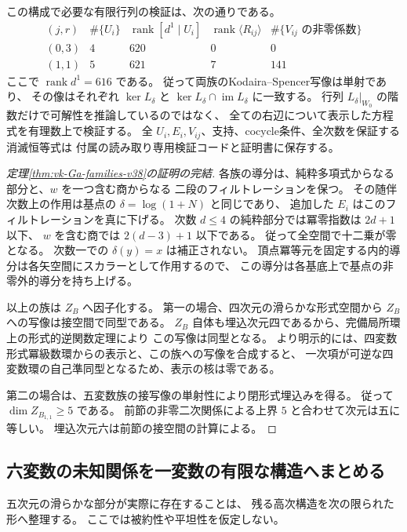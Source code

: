 この構成で必要な有限行列の検証は、次の通りである。
\[
\begin{array}{c|c|c|c|c}
 (j,r)&\#\{U_i\}&\operatorname{rank}[d^1\mid U_i]&
 \operatorname{rank}\langle R_{ij}\rangle&\#\{V_{ij}\text{ の非零係数}\}\\\hline
 (0,3)&4&620&0&0\\
 (1,1)&5&621&7&141
\end{array}
\]
ここで $\operatorname{rank}d^1=616$ である。
従って両族のKodaira--Spencer写像は単射であり、
その像はそれぞれ $\ker L_\delta$ と
$\ker L_\delta\cap\operatorname{im}L_\delta$ に一致する。
行列 $L_\delta|_{W_0}$ の階数だけで可解性を推論しているのではなく、
全ての右辺について表示した方程式を有理数上で検証する。
全 $U_i,E_i,V_{ij}$、支持、cocycle条件、全次数を保証する消滅恒等式は
付属の読み取り専用検証コードと証明書に保存する。

\begin{proof}[定理\ref{thm:vk-Ga-families-v38}の証明の完結]
各族の導分は、純粋多項式からなる部分と、$w$ を一つ含む商からなる
二段のフィルトレーションを保つ。
その随伴次数上の作用は基点の $\delta=\log(1+N)$ と同じであり、
追加した $E_i$ はこのフィルトレーションを真に下げる。
次数 $d\le4$ の純粋部分では冪零指数は $2d+1$ 以下、
$w$ を含む商では $2(d-3)+1$ 以下である。
従って全空間で十二乗が零となる。
次数一での $\delta(y)=x$ は補正されない。
頂点冪等元を固定する内的導分は各矢空間にスカラーとして作用するので、
この導分は各基底上で基点の非零外的導分を持ち上げる。

以上の族は $Z_B$ へ因子化する。
第一の場合、四次元の滑らかな形式空間から $Z_B$ への写像は接空間で同型である。
$Z_B$ 自体も埋込次元四であるから、完備局所環上の形式的逆関数定理により
この写像は同型となる。
より明示的には、四変数形式冪級数環からの表示と、この族への写像を合成すると、
一次項が可逆な四変数環の自己準同型となるため、表示の核は零である。

第二の場合は、五変数族の接写像の単射性により閉形式埋込みを得る。
従って $\dim Z_{B_{1,1}}\ge5$ である。
前節の非零二次関係による上界 $5$ と合わせて次元は五に等しい。
埋込次元六は前節の接空間の計算による。
\end{proof}

\subsection{六変数の未知関係を一変数の有限な構造へまとめる}

五次元の滑らかな部分が実際に存在することは、
残る高次構造を次の限られた形へ整理する。
ここでは被約性や平坦性を仮定しない。

